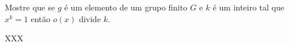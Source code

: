 \begin{homeworkProblem}
  Mostre que se $g$ é um elemento de um grupo finito $G$ e $k$ é um inteiro tal que $x^k = 1$ então $o(x)$ divide $k$.
  \begin{solution}
    XXX
  \end{solution}
\end{homeworkProblem}
